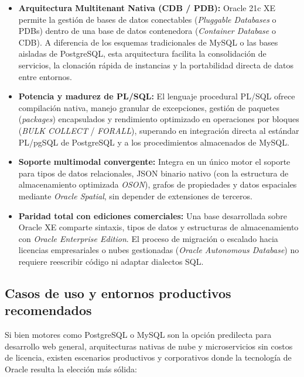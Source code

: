     \begin{itemize}
    	\item \textbf{Arquitectura Multitenant Nativa (CDB / PDB):} Oracle 21c XE permite la gestión de bases de datos conectables (\textit{Pluggable Databases} o PDBs) dentro de una base de datos contenedora (\textit{Container Database} o CDB). A diferencia de los esquemas tradicionales de MySQL o las bases aisladas de PostgreSQL, esta arquitectura facilita la consolidación de servicios, la clonación rápida de instancias y la portabilidad directa de datos entre entornos.
    	\item \textbf{Potencia y madurez de PL/SQL:} El lenguaje procedural PL/SQL ofrece compilación nativa, manejo granular de excepciones, gestión de paquetes (\textit{packages}) encapsulados y rendimiento optimizado en operaciones por bloques (\textit{BULK COLLECT} / \textit{FORALL}), superando en integración directa al estándar PL/pgSQL de PostgreSQL y a los procedimientos almacenados de MySQL.
    	\item \textbf{Soporte multimodal convergente:} Integra en un único motor el soporte para tipos de datos relacionales, JSON binario nativo (con la estructura de almacenamiento optimizada \textit{OSON}), grafos de propiedades y datos espaciales mediante \textit{Oracle Spatial}, sin depender de extensiones de terceros.
    	\item \textbf{Paridad total con ediciones comerciales:} Una base desarrollada sobre Oracle XE comparte sintaxis, tipos de datos y estructuras de almacenamiento con \textit{Oracle Enterprise Edition}. El proceso de migración o escalado hacia licencias empresariales o nubes gestionadas (\textit{Oracle Autonomous Database}) no requiere reescribir código ni adaptar dialectos SQL.
    \end{itemize}
    
    \subsection{Casos de uso y entornos productivos recomendados}
    
    Si bien motores como PostgreSQL o MySQL son la opción predilecta para desarrollo web general, arquitecturas nativas de nube y microservicios sin costos de licencia, existen escenarios productivos y corporativos donde la tecnología de Oracle resulta la elección más sólida:
    
